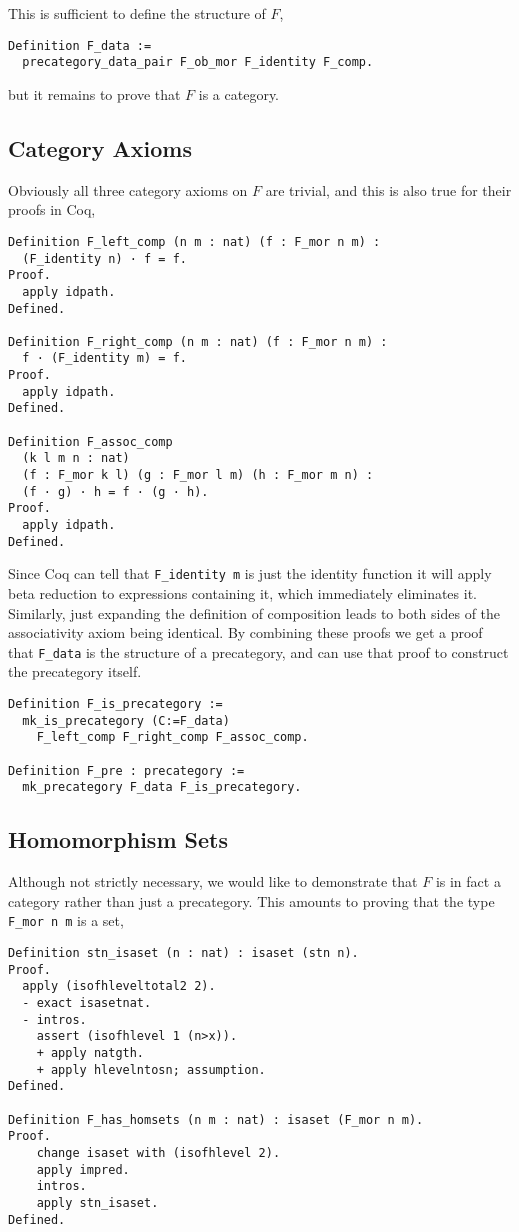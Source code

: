 This is sufficient to define the structure of $F$,
\begin{lstlisting}
Definition F_data := 
  precategory_data_pair F_ob_mor F_identity F_comp.
\end{lstlisting}
but it remains to prove that $F$ is a category.

\subsection{Category Axioms}
Obviously all three category axioms on $F$ are trivial, and this is also true
for their proofs in Coq,
\begin{lstlisting}
Definition F_left_comp (n m : nat) (f : F_mor n m) : 
  (F_identity n) · f = f.
Proof.
  apply idpath.
Defined.

Definition F_right_comp (n m : nat) (f : F_mor n m) : 
  f · (F_identity m) = f.
Proof.
  apply idpath.
Defined.

Definition F_assoc_comp 
  (k l m n : nat)
  (f : F_mor k l) (g : F_mor l m) (h : F_mor m n) :
  (f · g) · h = f · (g · h).
Proof.
  apply idpath.
Defined.
\end{lstlisting}

Since Coq can tell that \lstinline|F_identity m| is just the identity function it
will apply beta reduction to expressions containing it, which immediately
eliminates it. Similarly, just expanding the definition of composition leads to
both sides of the associativity axiom being identical. By combining these proofs
we get a proof that \lstinline|F_data| is the structure of a precategory, and can
use that proof to construct the precategory itself.

\begin{lstlisting}
Definition F_is_precategory := 
  mk_is_precategory (C:=F_data) 
    F_left_comp F_right_comp F_assoc_comp.

Definition F_pre : precategory := 
  mk_precategory F_data F_is_precategory.
\end{lstlisting}

\subsection{Homomorphism Sets}
Although not strictly necessary, we would like to demonstrate that $F$ is in
fact a category rather than just a precategory. This amounts to proving that the
type \lstinline|F_mor n m| is a set,

\begin{lstlisting}
Definition stn_isaset (n : nat) : isaset (stn n).
Proof.
  apply (isofhleveltotal2 2).
  - exact isasetnat.
  - intros.
    assert (isofhlevel 1 (n>x)).
    + apply natgth.
    + apply hlevelntosn; assumption.
Defined.

Definition F_has_homsets (n m : nat) : isaset (F_mor n m).
Proof.
    change isaset with (isofhlevel 2).
    apply impred.
    intros.
    apply stn_isaset.
Defined.
\end{lstlisting}


